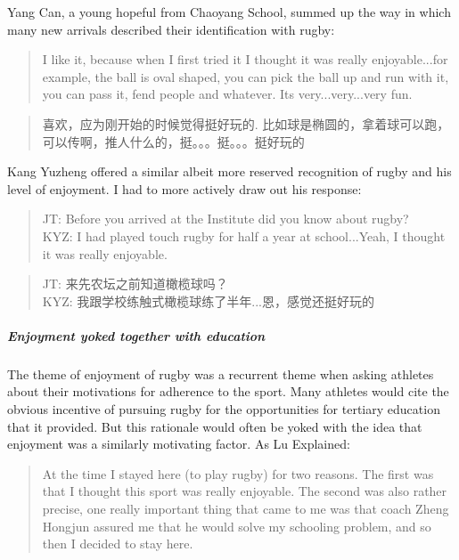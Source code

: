 \begin{CJK}{UTF8}{gbsn}
Yang Can, a young hopeful from Chaoyang School, summed up the way in which many new arrivals described their identification with rugby:

      \begin{quotation}
        I like it, because when I first tried it I thought it was really enjoyable...for example, the ball is oval shaped, you can pick the ball up and run with it, you can pass it, fend people and whatever.  Its very...very...very fun.
      \end{quotation}

      \begin{quotation}
        喜欢，应为刚开始的时候觉得挺好玩的.	比如球是椭圆的，拿着球可以跑，可以传啊，推人什么的，挺。。。挺。。。挺好玩的 
      \end{quotation}

Kang Yuzheng offered a similar albeit more reserved recognition of rugby and his level of enjoyment.  I had to more actively draw out his response:

      \begin{quotation}
        JT: Before you arrived at the Institute did you know about rugby?\\
        KYZ: I had played touch rugby for half a year at school...Yeah, I thought it was really enjoyable.
      \end{quotation}

      \begin{quotation}
        JT: 来先农坛之前知道橄榄球吗？\\
        KYZ: 我跟学校练触式橄榄球练了半年...恩，感觉还挺好玩的
      \end{quotation}


\subparagraph{Enjoyment yoked together with education}
The theme of enjoyment of rugby was a recurrent theme when asking athletes about their motivations for adherence to the sport.  Many athletes would cite the obvious incentive of pursuing rugby for the opportunities for tertiary education that it provided.  But this rationale would often be yoked with the idea that enjoyment was a similarly motivating factor.  As Lu Explained:

    \begin{quotation}
      At the time I stayed here (to play rugby) for two reasons.  The first was that I thought this sport was really enjoyable. The second was also rather precise, one really important thing that came to me was that coach Zheng Hongjun assured me that he would solve my schooling problem, and so then I decided to stay here.
    \end{quotation}


\end{CJK}
